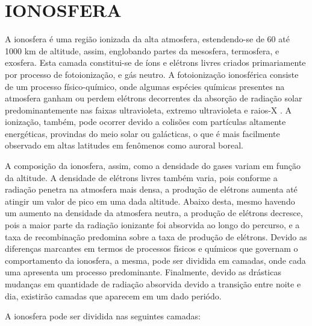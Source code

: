\chapter{IONOSFERA}

A ionosfera é uma região ionizada da alta atmosfera, estendendo-se de 60 até 1000 km de altitude, assim, englobando partes da mesosfera, termosfera, e exosfera. Esta camada constitui-se de íons e elétrons livres criados primariamente por processo de fotoionização, e gás neutro. A fotoionização ionosférica consiste de um processo físico-químico, onde algumas espécies químicas presentes na atmosfera ganham ou perdem elétrons decorrentes da absorção de radiação solar predominantemente nas faixas ultravioleta, extremo ultravioleta e raios-X \cite{RISNBETH:1969, NEGRETI:2012}. A ionização, também, pode ocorrer devido a colisões com partículas altamente energéticas, provindas do meio solar ou galácticas, o que é mais facilmente observado em altas latitudes em fenômenos como auroral boreal.

A composição da ionosfera, assim, como a densidade do gases variam em função da altitude. A densidade de elétrons livres também varia, pois conforme a radiação penetra na atmosfera mais densa, a produção de elétrons aumenta até atingir um valor de pico em uma dada altitude. Abaixo desta, mesmo havendo um aumento na densidade da atmosfera neutra, a produção de elétrons decresce, pois a maior parte da radiação ionizante foi absorvida ao longo do percurso, e a taxa de recombinação predomina sobre a taxa de produção de elétrons. Devido as diferenças marcantes em termos de processos físicos e químicos que governam o comportamento da ionosfera, a mesma, pode ser dividida em camadas, onde cada uma apresenta um processo predominante. Finalmente, devido as drásticas mudanças em quantidade de radiação absorvida devido a transição entre noite e dia, existirão camadas que aparecem em um dado periódo.

A ionosfera pode ser dividida nas seguintes camadas:

